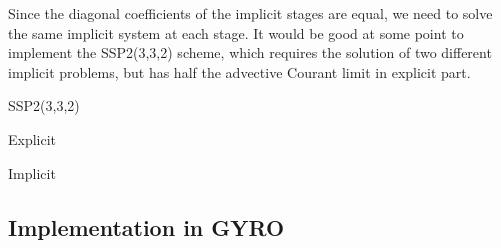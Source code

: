 %
Since the diagonal coefficients of the implicit stages are equal, we need 
to solve the same implicit system at each stage.  It would be good at some 
point to implement the SSP2(3,3,2) scheme, which requires the solution of 
two different implicit problems, but has half the advective Courant limit 
in explicit part.
%
\begin{center}SSP2(3,3,2)
\parbox{.3\linewidth}{
\mbox{Explicit} \par
{}}
\parbox{.3\linewidth}{
\mbox{Implicit} \par
{}}
\end{center}

\subsection{Implementation in GYRO}

